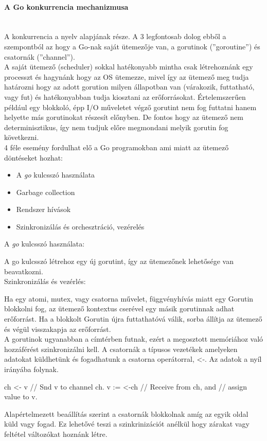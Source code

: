 \paragraph{A Go konkurrencia mechanizmusa} \mbox{} \\
A konkurrencia a nyelv alapjának része. A 3 legfontosab dolog ebből a szempontból az hogy a Go-nak saját ütemezője van,
a gorutinok (''goroutine'') és csatornák (''channel'').\\
A saját ütemező (scheduler) sokkal hatékonyabb mintha csak létrehoznánk egy processzt és hagynánk hogy az OS ütemezze,
mivel így az ütemező meg tudja határozni hogy az adott gorution milyen állapotban van (várakozik, futtatható, vagy fut) és hatékonyabban tudja
kiosztani az erőforrásokat. Értelemszerűen például egy blokkoló, épp I/O műveletet végző gorutint nem fog futtatni hanem helyette más gorutinokat részesít
előnyben. De fontos hogy az ütemező nem determinisztikus, így nem tudjuk előre megmondani melyik gorutin fog következni.\\
4 féle esemény fordulhat elő a Go programokban ami miatt az ütemező döntéseket hozhat:
\begin{itemize}
    \item A \emph{go} kulcsszó használata
    \item Garbage collection
    \item Rendszer hívások
    \item Szinkronizálás és orchesztráció, vezérelés
\end{itemize}
A \emph{go} kulcsszó használata: \par
A go kulcsszó létrehoz egy új gorutint, így az ütemezőnek lehetősége van beavatkozni.\\
Szinkronizálás és vezérlés: \par
Ha egy atomi, mutex, vagy csatorna művelet, függvényhívás miatt egy Gorutin blokkolni fog, az ütemező kontextus cserével egy másik gorutinnak adhat erőforrást. Ha a blokkolt Gorutin újra futtathatóvá válik, sorba állítja az ütemező és végül visszakapja az erőforrást.\\

A gorutinok ugyanabban a címtérben futnak, ezért a megosztott memóriához való hozzáférést szinkronizálni kell.
A csatornák a típusos vezetékek amelyeken adatokat küldhetünk és fogadhatunk a csatorna operátorral, <-.
Az adatok a nyíl irányába folynak.
\begin{python}
    ch <- v    // Snd v to channel ch.
    v := <-ch  // Receive from ch, and
    // assign value to v.
\end{python}
Alapértelmezett beaállítás szerint a csatornák blokkolnak amíg az egyik oldal küld vagy fogad.
Ez lehetővé teszi a szinkrinizációt anélkül hogy zárakat vagy feltétel változókat hoznánk létre.

